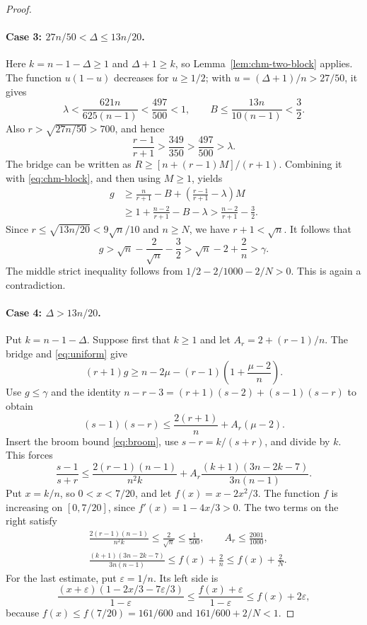 \documentclass[11pt,a4paper]{article}
\theoremstyle{remark}\newtheorem{remark}[theorem]{Remark}
\begin{document}
\begin{proof}
\paragraph{Case 3: $27n/50<\Delta\le13n/20$.}
Here $k=n-1-\Delta\ge1$ and $\Delta+1\ge k$, so
Lemma~\ref{lem:chm-two-block} applies. The function $u(1-u)$
decreases for $u\ge1/2$; with $u=(\Delta+1)/n>27/50$, it gives
\begin{equation}\label{eq:chm-middle-coefficients}
 \lambda<\frac{621n}{625(n-1)}<\frac{497}{500}<1,
 \qquad B\le\frac{13n}{10(n-1)}<\frac32.
\end{equation}
Also $r>\sqrt{27n/50}>700$, and hence
\[
 \frac{r-1}{r+1}>\frac{349}{350}>\frac{497}{500}>\lambda.
\]
The bridge can be written as
$R\ge[n+(r-1)M]/(r+1)$. Combining it with
\eqref{eq:chm-block}, and then using $M\ge1$, yields
\begin{align*}
 g&\ge\frac n{r+1}-B+
           \left(\frac{r-1}{r+1}-\lambda\right)M\\
  &\ge1+\frac{n-2}{r+1}-B-\lambda
   >\frac{n-2}{r+1}-\frac32.
\end{align*}
Since $r\le\sqrt{13n/20}<9\sqrt n/10$ and $n\ge N$, we have
$r+1<\sqrt n$. It follows that
\[
 g>\sqrt n-\frac2{\sqrt n}-\frac32
   >\sqrt n-2+\frac2n>\gamma.
\]
The middle strict inequality follows from
$1/2-2/1000-2/N>0$. This is again a contradiction.

\paragraph{Case 4: $\Delta>13n/20$.}
Put $k=n-1-\Delta$. Suppose first that $k\ge1$ and let
$A_r=2+(r-1)/n$. The bridge and \eqref{eq:uniform} give
\[
 (r+1)g\ge n-2\mu-(r-1)\left(1+\frac{\mu-2}{n}\right).
\]
Use $g\le\gamma$ and the identity
$n-r-3=(r+1)(s-2)+(s-1)(s-r)$ to obtain
\[
 (s-1)(s-r)\le\frac{2(r+1)}n+A_r(\mu-2).
\]
Insert the broom bound \eqref{eq:broom}, use
$s-r=k/(s+r)$, and divide by $k$. This forces
\begin{equation}\label{eq:chm-forced}
 \frac{s-1}{s+r}
 \le\frac{2(r-1)(n-1)}{n^2k}
       +A_r\frac{(k+1)(3n-2k-7)}{3n(n-1)}.
\end{equation}
Put $x=k/n$, so $0<x<7/20$, and let $f(x)=x-2x^2/3$.
The function $f$ is increasing on $[0,7/20]$, since $f'(x)=1-4x/3>0$. The two terms on the right satisfy
\begin{align}
 &\frac{2(r-1)(n-1)}{n^2k}\le\frac2{\sqrt n}
              \le\frac1{500},\qquad
 A_r\le\frac{2001}{1000},\label{eq:chm-high-errors}\\
 &\frac{(k+1)(3n-2k-7)}{3n(n-1)}
              \le f(x)+\frac2n\le f(x)+\frac2N.
              \label{eq:chm-high-fraction}
\end{align}
For the last estimate, put $\varepsilon=1/n$. Its left side is
\[
 \frac{(x+\varepsilon)(1-2x/3-7\varepsilon/3)}{1-\varepsilon}
 \le\frac{f(x)+\varepsilon}{1-\varepsilon}
 \le f(x)+2\varepsilon,
\]
because $f(x)\le f(7/20)=161/600$ and
$161/600+2/N<1$.


\end{proof}
\end{document}
